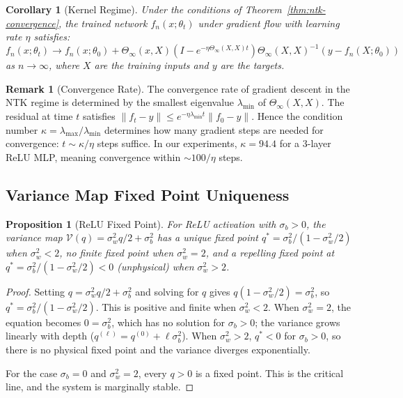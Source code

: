 \documentclass[10pt]{article}
\newtheorem{proposition}[theorem]{Proposition}
\newtheorem{corollary}[theorem]{Corollary}
\theoremstyle{definition}
\newtheorem{remark}[theorem]{Remark}
\begin{document}
\begin{corollary}[Kernel Regime]
Under the conditions of Theorem~\ref{thm:ntk-convergence}, the trained network $f_n(x; \theta_t)$ under gradient flow with learning rate $\eta$ satisfies:
\begin{equation}
  f_n(x; \theta_t) \to f_n(x; \theta_0) + \Theta_\infty(x, X)(I - e^{-\eta \Theta_\infty(X,X) t})\Theta_\infty(X,X)^{-1}(y - f_n(X;\theta_0))
\end{equation}
as $n \to \infty$, where $X$ are the training inputs and $y$ are the targets.
\end{corollary}

\begin{remark}[Convergence Rate]
The convergence rate of gradient descent in the NTK regime is determined by the smallest eigenvalue $\lambda_{\min}$ of $\Theta_\infty(X, X)$.
The residual at time $t$ satisfies $\|f_t - y\| \leq e^{-\eta \lambda_{\min} t} \|f_0 - y\|$.
Hence the condition number $\kappa = \lambda_{\max}/\lambda_{\min}$ determines how many gradient steps are needed for convergence: $t \sim \kappa / \eta$ steps suffice.
In our experiments, $\kappa = 94.4$ for a 3-layer ReLU MLP, meaning convergence within $\sim 100/\eta$ steps.
\end{remark}

\subsection{Variance Map Fixed Point Uniqueness}
\label{app:proof-uniqueness}

\begin{proposition}[ReLU Fixed Point]
\label{prop:relu-fp}
For ReLU activation with $\sigma_b > 0$, the variance map $\mathcal{V}(q) = \sigma_w^2 q/2 + \sigma_b^2$ has a unique fixed point $q^* = \sigma_b^2 / (1 - \sigma_w^2/2)$ when $\sigma_w^2 < 2$, no finite fixed point when $\sigma_w^2 = 2$, and a repelling fixed point at $q^* = \sigma_b^2 / (1 - \sigma_w^2/2) < 0$ (unphysical) when $\sigma_w^2 > 2$.
\end{proposition}

\begin{proof}
Setting $q = \sigma_w^2 q/2 + \sigma_b^2$ and solving for $q$ gives $q(1 - \sigma_w^2/2) = \sigma_b^2$, so $q^* = \sigma_b^2/(1 - \sigma_w^2/2)$.
This is positive and finite when $\sigma_w^2 < 2$.
When $\sigma_w^2 = 2$, the equation becomes $0 = \sigma_b^2$, which has no solution for $\sigma_b > 0$; the variance grows linearly with depth ($q^{(\ell)} = q^{(0)} + \ell \sigma_b^2$).
When $\sigma_w^2 > 2$, $q^* < 0$ for $\sigma_b > 0$, so there is no physical fixed point and the variance diverges exponentially.

For the case $\sigma_b = 0$ and $\sigma_w^2 = 2$, every $q > 0$ is a fixed point.
This is the critical line, and the system is marginally stable.
\end{proof}
\end{document}
